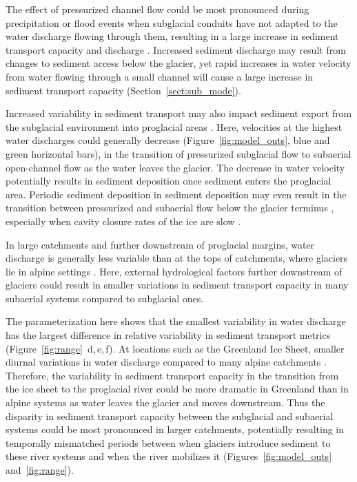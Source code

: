 \documentclass[11pt]{article}
\begin{document}
\begin{spacing}{1}
  The effect of pressurized channel flow could be most pronounced during precipitation or flood events when subglacial conduits have not adapted to the water discharge flowing through them, resulting in a large increase in sediment transport capacity and discharge \citep[e.g.][]{cowan1988,delaney2019}.
  Increased sediment discharge may result from changes to sediment access below the glacier, yet rapid increases in water velocity from water flowing through a small channel will cause a large increase in sediment transport capacity (Section~\ref{sect:sub_mode}).
  
  Increased variability in sediment transport may also impact sediment export from the subglacial environment into proglacial areas \citep[e.g.][]{delaney2017,perolo2018}.
  Here, velocities at the highest water discharges could generally decrease (Figure~\ref{fig:model_outs}, blue and green horizontal bars), in the transition of pressurized subglacial flow to subaerial open-channel flow as the water leaves the glacier. The decrease in water velocity potentially results in sediment deposition once sediment enters the proglacial area.
  Periodic sediment deposition in sediment deposition may even result in the transition between pressurized and subaerial flow below the glacier terminus \citep{perolo2018}, especially when cavity closure rates of the ice are slow \citep{egli2021b}.
  
  In large catchments and further downstream of proglacial margins, water discharge is generally less variable than at the tops of catchments, where glaciers lie in alpine settings \citep[c.f.][]{swift2005,riihimaki2005,costa2017,vanas2017}.
  Here, external hydrological factors further downstream of glaciers could result in smaller variations in sediment transport capacity in many subaerial systems compared to subglacial ones.

  The parameterization here shows that the smallest variability in water discharge has the largest difference in relative variability in sediment transport metrics (Figure~\ref{fig:range}\, d,\,e,\,f).
  At locations such as the Greenland Ice Sheet, smaller diurnal variations in water discharge compared to many alpine catchments \citep[c.f.][]{swift2005,riihimaki2005,vanas2017,hasholt2018}.
  Therefore, the variability in sediment transport capacity in the transition from the ice sheet to the proglacial river could be more dramatic in Greenland than in alpine systems as water leaves the glacier and moves downstream.
  Thus the disparity in sediment transport capacity between the subglacial and subaerial systems could be most pronounced in larger catchments, potentially resulting in temporally mismatched periods between when glaciers introduce sediment to these river systems  and when the river mobilizes it (Figures~\ref{fig:model_outs}~ and~\ref{fig:range}).
  

\end{spacing}
\end{document}
